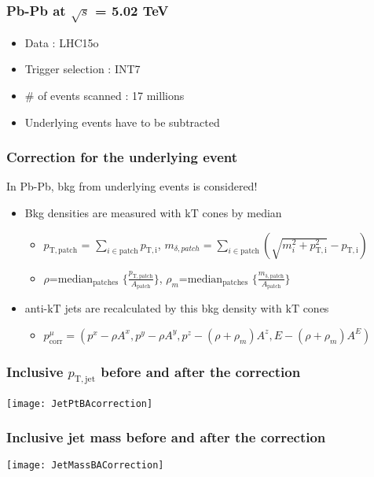 \begin{frame}
\frametitle{Pb-Pb at $\sqrt{s}$ = 5.02 TeV}
\begin{itemize}
\item Data : LHC15o
\item Trigger selection : INT7
\item $\#$ of events scanned : 17 millions 
\item Underlying events have to be subtracted
\end{itemize}
\end{frame}

\begin{frame}
\frametitle{Correction for the underlying event}
In Pb-Pb, bkg from underlying events is considered!\\
\begin{itemize}
	\item{Bkg densities are measured with $\mathrm{kT}$ cones by median}
		\begin{itemize}
			\item{$p_\mathrm{T,patch}$ = $\sum_{i \in \mathrm{patch}} p_\mathrm{T,i}$, $m_{\delta,patch} = \sum_{i \in \mathrm{patch}} (\sqrt{m_i^2+p_\mathrm{T,i}^2} - p_\mathrm{T,i})$}
			\item{$\rho$=$\mathrm{median}_\mathrm{patches}$ $\{ \frac{p_\mathrm{T,patch}}{A_\mathrm{patch}}\}$, $\rho_m$=$\mathrm{median}_\mathrm{patches}$ $\{ \frac{m_\mathrm{\delta,patch}}{A_\mathrm{patch}}\}$}
		\end{itemize}
	\item{anti-$\mathrm{kT}$ jets are recalculated by this bkg density with $\mathrm{kT}$ cones }
	\begin{itemize}
		\item $p^{\mu}_\mathrm{corr} = (p^x-\rho A^x, p^y-\rho A^y, p^z-(\rho+\rho_m)A^z, E-(\rho+\rho_m)A^E)$
	\end{itemize}
\end{itemize}

\end{frame}

\begin{frame}
\frametitle{Inclusive $p_\mathrm{T,jet}$ before and after the correction}
\texttt{[image: JetPtBAcorrection]}\\
\end{frame}

\begin{frame}
\frametitle{Inclusive jet mass before and after the correction}
\texttt{[image: JetMassBACorrection]}\\
\end{frame}

